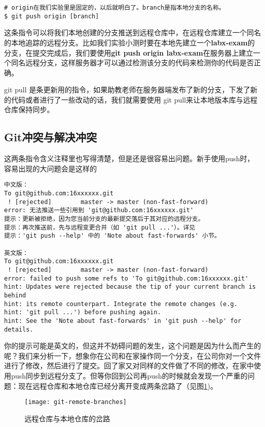 \begin{verbatim}
# origin在我们实验里是固定的，以后就明白了。branch是指本地分支的名称。
$ git push origin [branch]
\end{verbatim}

这条指令可以将我们本地创建的分支推送到远程仓库中，在远程仓库建立一个同名的本地追踪的远程分支。比如我们实验小测时要在本地先建立一个\textbf{labx-exam}的分支，在提交完成后，我们要使用\textbf{git push origin labx-exam}在服务器上建立一个同名远程分支，这样服务器才可以通过检测该分支的代码来检测你的代码是否正确。

git pull\label{更新指令} 是条更新用的指令，如果助教老师在服务器端发布了新的分支，下发了新的代码或者进行了一些改动的话，我们就需要使用 git pull来让本地版本库与远程仓库保持同步。

\subsection{Git冲突与解决冲突}

这两条指令含义注释里也写得清楚，但是还是很容易出问题。新手使用push时，容易出现的大问题会是这样的

\begin{verbatim}
中文版：
To git@github.com:16xxxxxx.git
 ! [rejected]        master -> master (non-fast-forward) 
error: 无法推送一些引用到 'git@github.com:16xxxxxx.git' 
提示：更新被拒绝，因为您当前分支的最新提交落后于其对应的远程分支。 
提示：再次推送前，先与远程变更合并（如 'git pull ...'）。详见 
提示：'git push --help' 中的 'Note about fast-forwards' 小节。

英文版：
To git@github.com:16xxxxxx.git
 ! [rejected]        master -> master (non-fast-forward)
error: failed to push some refs to 'To git@github.com:16xxxxxx.git'
hint: Updates were rejected because the tip of your current branch is behind
hint: its remote counterpart. Integrate the remote changes (e.g.
hint: 'git pull ...') before pushing again.
hint: See the 'Note about fast-forwards' in 'git push --help' for details.
\end{verbatim}

你的提示可能是英文的，但这并不妨碍问题的发生，这个问题是因为什么而产生的呢？我们来分析一下，想象你在公司和在家操作同一个分支，在公司你对一个文件进行了修改，然后进行了提交。回了家又对同样的文件做了不同的修改，在家中使用push同步到远程分支了。但等你回到公司再push的时候就会发现一个严重的问题：现在远程仓库和本地仓库已经分离开变成两条岔路了（见图\ref{git-remote-branches})。

\begin{figure}[htbp]
  \centering
  \texttt{[image: git-remote-branches]}
  \caption{远程仓库与本地仓库的岔路}\label{git-remote-branches}
\end{figure}

